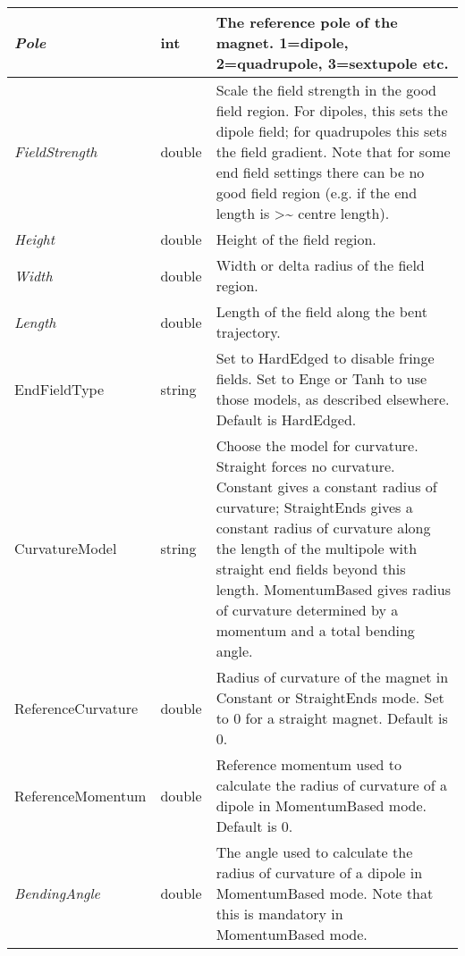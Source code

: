 \begin{center}
\tabletail{}
\tablelasttail{}
\begin{supertabular}{|m{3.691cm}|m{1.252cm}|m{10cm}|}
\hline
{\itshape Pole} &
int &
The reference pole of the magnet. 1=dipole, 2=quadrupole, 3=sextupole etc.\\\hline
{\itshape FieldStrength} &
double &
Scale the field strength in the good field region. For dipoles, this sets the dipole field; for quadrupoles this sets
the field gradient. Note that for some end field settings there can be no good field region (e.g. if the end length is
{\textgreater}\~{} centre length).\\\hline
{\itshape Height} &
double &
Height of the field region.\\\hline
{\itshape Width} &
double &
Width or delta radius of the field region.\\\hline
{\itshape Length} &
double &
Length of the field along the bent trajectory.\\\hline
EndFieldType &
string &
Set to HardEdged to disable fringe fields. Set to Enge or Tanh to use those models, as described elsewhere. Default is
HardEdged.\\\hline
CurvatureModel &
string &
Choose the model for curvature. Straight forces no curvature. Constant gives a constant radius of curvature;
StraightEnds gives a constant radius of curvature along the length of the multipole with straight end fields beyond
this length. MomentumBased gives radius of curvature determined by a momentum and a total bending angle.\\\hline
ReferenceCurvature &
double &
Radius of curvature of the magnet in Constant or StraightEnds mode. Set to 0 for a straight magnet. Default is
0.\\\hline
ReferenceMomentum &
double &
Reference momentum used to calculate the radius of curvature of a dipole in MomentumBased mode. Default is 0.\\\hline
{\itshape BendingAngle} &
double &
The angle used to calculate the radius of curvature of a dipole in MomentumBased mode. Note that this is mandatory in
MomentumBased mode.\\\hline
\end{supertabular}
\end{center}

